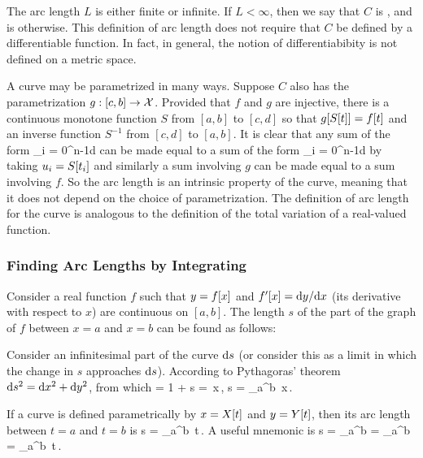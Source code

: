 The arc length $L$ is either finite or infinite. If $L<\infty$, then we say that $C$ is , and is  otherwise. This definition of arc length does not require that $C$ be defined by a differentiable function. In fact, in general, the notion of differentiabibity is not defined on a metric space.

A curve may be parametrized in many ways. Suppose $C$ also has the parametrization ${g}:{[c,b]}\to{\mathcal{X}}$. Provided that $f$ and $g$ are injective, there is a continuous monotone function $S$ from $[a,b]$ to $[c,d]$ so that $g\!\left[{S\!\left[{t}\right]}\right] = f\!\left[{t}\right]$ and an inverse function $S^{-1}$ from $[c,d]$ to $[a,b]$. It is clear that any sum of the form
\beq
\sum_{i = 0}^{n-1}d
\eeq
can be made equal to a sum of the form
\beq
\sum_{i = 0}^{n-1}d
\eeq
by taking $u_i = S\!\left[{t_i}\right]$ and similarly a sum involving $g$ can be made equal to a sum involving $f$. So the arc length is an intrinsic property of the curve, meaning that it does not depend on the choice of parametrization. The definition of arc length for the curve is analogous to the definition of the total variation of a real-valued function.


\subsubsection{Finding Arc Lengths by Integrating}
Consider a real function $f$ such that $y = f\!\left[{x}\right]$ and $f'\!\left[{x}\right] = \text{d} y/\text{d} x$ (its derivative with respect to $x$) are continuous on $[a,b]$. The length $s$ of the part of the graph of $f$ between $x=a$ and $x=b$ can be found as follows:

Consider an infinitesimal part of the curve $\text{d} s$ (or consider this as a limit in which the change in $s$ approaches $\text{d} s$). According to Pythagoras' theorem $\text{d} s^2 = \text{d} x^2 + \text{d} y^2$, from which
\beq
{} = 1 + 
          \implies \dx s = \,\dx x\,,
          \implies s = \int_a^b \,\dx x\,.
\eeq 

If a curve is defined parametrically by $x = X\!\left[{t}\right]$ and $y = Y\!\left[{t}\right]$, then its arc length between $t=a$ and $t=b$ is
\beq
s = \int_a^b \,\dx t\,.
\eeq
A useful mnemonic is
\beq
s = \lim\sum_a^b  
  = \int_a^b  
  = \int_a^b \,\dx t\,.
\eeq




